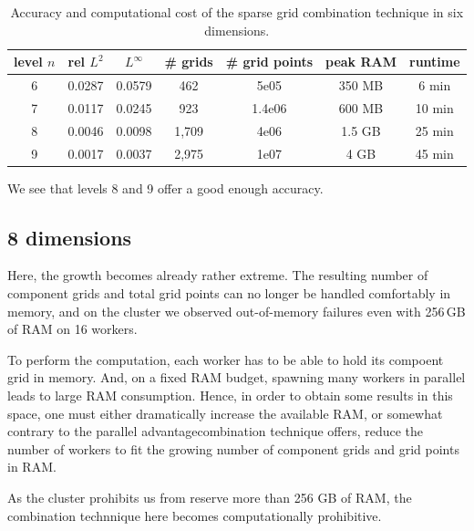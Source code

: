 \begin{table}[ht]
\centering
\begin{tabular}{ |c|c|c|c|c|c|c| } 
\hline
level $n$ & rel $L^2$ & $L^\infty$ & \# grids & \# grid points & peak RAM & runtime \\
\hline
6 & 0.0287 & 0.0579 & 462 & 5e05 & 350 MB & 6 min \\
\hline
7 & 0.0117 & 0.0245 & 923 & 1.4e06 & 600 MB & 10 min \\ %
\hline
8 & 0.0046 & 0.0098 & 1,709 & 4e06 & 1.5 GB & 25 min \\ %
\hline
9 & 0.0017 & 0.0037 & 2,975 & 1e07 & 4 GB & 45 min \\
\hline
\end{tabular}
\caption{Accuracy and computational cost of the sparse grid combination technique in six dimensions.}
\label{tab:sg-6d}
\end{table}

We see that levels 8 and 9 offer a good enough accuracy.



\subsection{8 dimensions}

Here, the growth becomes already rather extreme.
The resulting number of component grids and total grid points can no longer be handled comfortably in memory,
and on the cluster we observed out-of-memory failures even with 256\,GB of RAM on 16 workers.

To perform the computation, each worker has to be able to hold its compoent grid in memory.
And, on a fixed RAM budget, spawning many workers in parallel leads to large RAM consumption.
Hence, in order to obtain some results in this space,
one must either dramatically increase the available RAM,
or somewhat contrary to the parallel advantagecombination technique offers,
reduce the number of workers to fit the growing number of component grids and grid points in RAM.

As the cluster prohibits us from reserve more than 256 GB of RAM, the combination technnique
here becomes computationally prohibitive.




